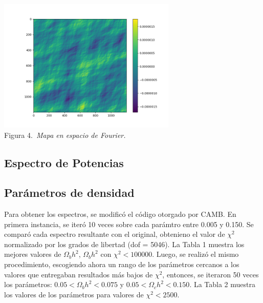 \documentclass[twocolumn,letterpaper,spanish]{revtex4}
\numberwithin{equation}{section}
\begin{document}
\begin{center}
   \includegraphics[width=85mm]{M_tetha.png}\\
   Figura 4.\emph{\ Mapa en espacio de Fourier.}
\end{center}

\subsection{Espectro de Potencias}

\subsection{Par\'ametros de densidad}

Para obtener los espectros, se modific\'o el c\'odigo otorgado por CAMB. En primera instancia, se iter\'o 10 veces sobre cada par\'amtro entre 0.005 y 0.150. Se compar\'o cada espectro resultante con el original, obtenieno el valor de $\chi^2$ normalizado por los grados de libertad (dof = 5046). La Tabla 1 muestra los mejores valores de $\Omega_b h^2$, $\Omega_b h^2$ con $\chi^2<100000$. Luego, se realiz\'o el mismo procedimiento, escogiendo ahora un rango de los par\'ametros cercanos a los valores que entregaban resultados m\'as bajos de $\chi^2$, entonces, se iteraron 50 veces los par\'ametros: $0.05<\Omega_b h^2< 0.075$ y $0.05<\Omega_c h^2<0.150$. La Tabla 2 muestra los valores de los par\'ametros para valores de $\chi^2<2500$.
\end{document}
